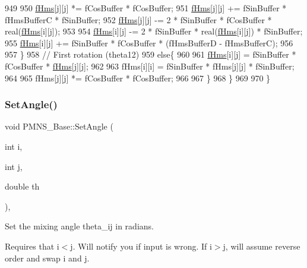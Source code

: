 \begin{DoxyCode}
949 
950       \hyperlink{classOscProb_1_1PMNS__Base_acd3c8783e7603081eab316ea4c86c766}{fHms}[j][j] *= fCosBuffer * fCosBuffer;
951       \hyperlink{classOscProb_1_1PMNS__Base_acd3c8783e7603081eab316ea4c86c766}{fHms}[j][j] += fSinBuffer * fHmsBufferC * fSinBuffer;
952       \hyperlink{classOscProb_1_1PMNS__Base_acd3c8783e7603081eab316ea4c86c766}{fHms}[j][j] -= 2 * fSinBuffer * fCosBuffer * real(\hyperlink{classOscProb_1_1PMNS__Base_acd3c8783e7603081eab316ea4c86c766}{fHms}[i][j]);
953 
954       \hyperlink{classOscProb_1_1PMNS__Base_acd3c8783e7603081eab316ea4c86c766}{fHms}[i][j] -= 2 * fSinBuffer * real(\hyperlink{classOscProb_1_1PMNS__Base_acd3c8783e7603081eab316ea4c86c766}{fHms}[i][j]) * fSinBuffer;
955       \hyperlink{classOscProb_1_1PMNS__Base_acd3c8783e7603081eab316ea4c86c766}{fHms}[i][j] += fSinBuffer * fCosBuffer * (fHmsBufferD - fHmsBufferC);
956 
957     \}
958     \textcolor{comment}{// First rotation (theta12)}
959     \textcolor{keywordflow}{else}\{
960 
961       \hyperlink{classOscProb_1_1PMNS__Base_acd3c8783e7603081eab316ea4c86c766}{fHms}[i][j] = fSinBuffer * fCosBuffer * \hyperlink{classOscProb_1_1PMNS__Base_acd3c8783e7603081eab316ea4c86c766}{fHms}[j][j];
962 
963       fHms[i][i] = fSinBuffer * fHms[j][j] * fSinBuffer;
964 
965       fHms[j][j] *= fCosBuffer * fCosBuffer;
966 
967     \}
968   \}
969 
970 \}
\end{DoxyCode}
\mbox{\label{classOscProb_1_1PMNS__Base_ace7875cf6d3bec161a2b7ed2690aec34}} 
\subsubsection{\texorpdfstring{Set\+Angle()}{SetAngle()}}
{\footnotesize\ttfamily void P\+M\+N\+S\+\_\+\+Base\+::\+Set\+Angle (\begin{DoxyParamCaption}\item[{int}]{i,  }\item[{int}]{j,  }\item[{double}]{th }\end{DoxyParamCaption})\hspace{0.3cm}{\ttfamily [virtual]}, {\ttfamily [inherited]}}

Set the mixing angle theta\+\_\+ij in radians.

Requires that i$<$j. Will notify you if input is wrong. If i$>$j, will assume reverse order and swap i and j.

